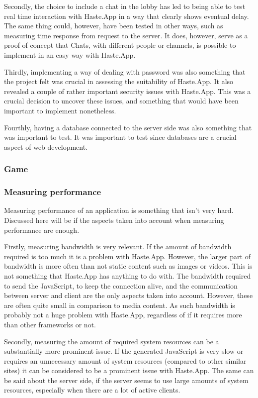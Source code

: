\documentclass[a4paper]{article}
\begin{document}
Secondly, the choice to include a chat in the lobby has led to being able to test real time interaction with Haste.App in a way that clearly shows eventual delay. The same thing could, however, have been tested in other ways, such as measuring time response from request to the server. It does, however, serve as a proof of concept that Chats, with different people or channels, is possible to implement in an easy way with Haste.App.

Thirdly, implementing a way of dealing with password was also something that the project felt was crucial in assessing the suitability of Haste.App. It also revealed a couple of rather important security issues with Haste.App. This was a crucial decision to uncover these issues, and something that would have been important to implement nonetheless. 

Fourthly, having a database connected to the server side was also something that was important to test. It was important to test since databases are a crucial aspect of web development.


\subsubsection{Game}


\subsubsection{Measuring performance}
Measuring performance of an application is something that isn't very hard. Discussed here will be if the aspects taken into account when measuring performance are enough. 

Firstly, measuring bandwidth is very relevant. If the amount of bandwidth required is too much it is a problem with Haste.App. However, the larger part of bandwidth is more often than not static content such as images or videos. This is not something that Haste.App has anything to do with. The bandwidth required to send the JavaScript, to keep the connection alive, and the communication between server and client are the only aspects taken into account. However, these are often quite small in comparison to media content. As such bandwidth is probably not a huge problem with Haste.App, regardless of if it requires more than other frameworks or not.

Secondly, measuring the amount of required system resources can be a substantially more prominent issue. If the generated JavaScript is very slow or requires an unnecessary amount of system resources (compared to other similar sites) it can be considered to be a prominent issue with Haste.App. The same can be said about the server side, if the server seems to use large amounts of system resources, especially when there are a lot of active clients.
\end{document}
